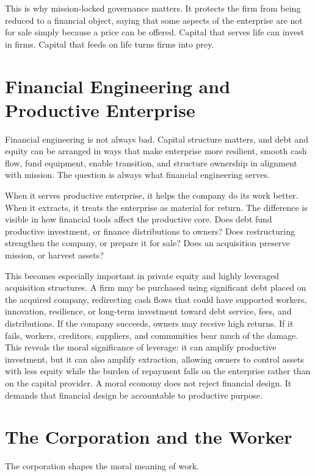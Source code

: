 \documentclass[11pt,a4paper,oneside]{book}
\begin{document}
This is why mission-locked governance matters. It protects the firm from being reduced to a financial object, saying that some aspects of the enterprise are not for sale simply because a price can be offered. Capital that serves life can invest in firms. Capital that feeds on life turns firms into prey.

\section*{Financial Engineering and Productive Enterprise}

Financial engineering is not always bad. Capital structure matters, and debt and equity can be arranged in ways that make enterprise more resilient, smooth cash flow, fund equipment, enable transition, and structure ownership in alignment with mission. The question is always what financial engineering serves.

When it serves productive enterprise, it helps the company do its work better. When it extracts, it treats the enterprise as material for return. The difference is visible in how financial tools affect the productive core. Does debt fund productive investment, or finance distributions to owners? Does restructuring strengthen the company, or prepare it for sale? Does an acquisition preserve mission, or harvest assets?

This becomes especially important in private equity and highly leveraged acquisition structures. A firm may be purchased using significant debt placed on the acquired company, redirecting cash flows that could have supported workers, innovation, resilience, or long-term investment toward debt service, fees, and distributions. If the company succeeds, owners may receive high returns. If it fails, workers, creditors, suppliers, and communities bear much of the damage. This reveals the moral significance of leverage: it can amplify productive investment, but it can also amplify extraction, allowing owners to control assets with less equity while the burden of repayment falls on the enterprise rather than on the capital provider. A moral economy does not reject financial design. It demands that financial design be accountable to productive purpose.

\section*{The Corporation and the Worker}

The corporation shapes the moral meaning of work.
\end{document}
